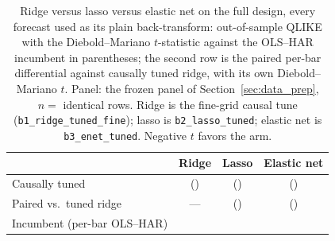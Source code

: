\begin{table}[H]
\centering
\caption{Ridge versus lasso versus elastic net on the full design, every
forecast used as its plain back-transform: out-of-sample QLIKE with the
Diebold--Mariano $t$-statistic against the OLS--HAR incumbent in
parentheses; the second row is the paired per-bar differential against
causally tuned ridge, with its own Diebold--Mariano $t$. Panel: the frozen panel of
Section~\ref{sec:data_prep}, $n =$ \unifAzeroN{} identical rows.
Ridge is the fine-grid causal tune
(\texttt{b1\_ridge\_tuned\_fine}); lasso is \texttt{b2\_lasso\_tuned};
elastic net is \texttt{b3\_enet\_tuned}.
Negative $t$ favors the arm.}
\label{tab:lasso_vs_ridge}
\small\setlength{\tabcolsep}{4pt}
\begin{tabular}{@{}lccc@{}}
\toprule
 & Ridge & Lasso & Elastic net \\
\midrule
Causally tuned & \unifBOneRidgeTunedFineQLIKE{} (\unifBOneRidgeTunedFineDM{}) & \unifBTwoLassoTunedQLIKE{} (\unifBTwoLassoTunedDM{}) & \unifBThreeEnetTunedQLIKE{} (\unifBThreeEnetTunedDM{}) \\
Paired vs.\ tuned ridge & --- & \unifIncrBTwoLassoTunedDQ{} (\unifIncrBTwoLassoTunedDM{}) & \unifIncrBThreeEnetTunedDQ{} (\unifIncrBThreeEnetTunedDM{}) \\
\midrule
Incumbent (per-bar OLS--HAR) & \multicolumn{3}{c}{\unifAzeroQLIKE{}} \\
\bottomrule
\end{tabular}
\end{table}

